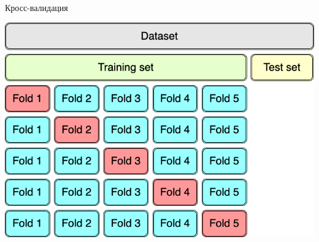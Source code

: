 \documentclass[11pt,aspectratio=169,handout]{beamer}
\begin{document}
\begin{frame}{Кросс-валидация}

\vfill

\begin{center}
\includegraphics[scale=0.4]{images/k-fold-cross-validation.png}
\end{center}

\vfill

\end{frame}
\end{document}
